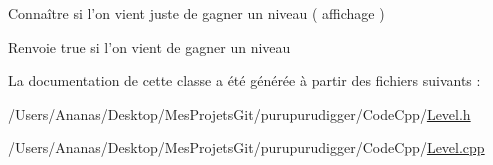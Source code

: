 Connaître si l'on vient juste de gagner un niveau ( affichage ) 

\begin{DoxyReturn}{Renvoie}
true si l'on vient de gagner un niveau 
\end{DoxyReturn}


La documentation de cette classe a été générée à partir des fichiers suivants \-:\begin{DoxyCompactItemize}
\item 
/\-Users/\-Ananas/\-Desktop/\-Mes\-Projets\-Git/purupurudigger/\-Code\-Cpp/\hyperlink{_level_8h}{Level.\-h}\item 
/\-Users/\-Ananas/\-Desktop/\-Mes\-Projets\-Git/purupurudigger/\-Code\-Cpp/\hyperlink{_level_8cpp}{Level.\-cpp}\end{DoxyCompactItemize}
